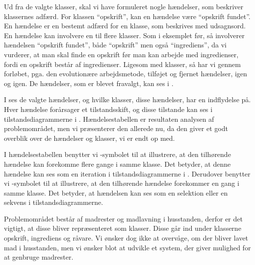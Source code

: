 Ud fra de valgte klasser, skal vi have formuleret nogle hændelser, som beskriver klassernes adfærd. For klassen ``opskrift'', kan en hændelse \fx være ``opskrift fundet''. En hændelse er en bestemt adfærd for en klasse, som beskrives med udsagnsord. En hændelse kan involvere en til flere klasser. Som i eksemplet før, så involverer hændelsen ``opskrift fundet'', både ``opskrift'' men også ``ingrediens'', da vi vurderer, at man skal finde en opskrift før man kan arbejde med ingredienser, fordi en opskrift består af ingredienser. Ligesom med klasser, så har vi gennem forløbet, pga. den evolutionære arbejdsmetode, tilføjet og fjernet hændelser, igen og igen. De hændelser, som er blevet fravalgt, kan ses i .

I  ses de valgte hændelser, og hvilke klasser, disse hændelser, har en indflydelse på. Hver hændelse forårsager et tilstandsskift, og disse tilstande kan ses i tilstandsdiagrammerne i . Hændelsestabellen er resultaten analysen af problemområdet, men vi præsenterer den allerede nu, da den giver et godt overblik over de hændelser og klasser, vi er endt op med. 

I hændelsestabellen benytter vi \iter-symbolet til at illustrere, at den tilhørende hændelse kan forekomme flere gange i samme klasse. Det betyder, at denne hændelse kan ses som en iteration i tilstandsdiagrammerne i . Derudover benytter vi \once-symbolet til at illustrere, at den tilhørende hændelse forekommer en gang i samme klasse. Det betyder, at hændelsen kan ses som en selektion eller en sekvens i tilstandsdiagrammerne.



Problemområdet består af madrester og madlavning i husstanden, derfor er det vigtigt, at disse bliver repræsenteret som klasser. Disse går ind under klasserne opskrift, ingrediens og råvare. Vi ønsker dog ikke at overvåge, om der bliver lavet mad i husstanden, men vi ønsker blot at udvikle et system, der giver mulighed for at genbruge madrester.